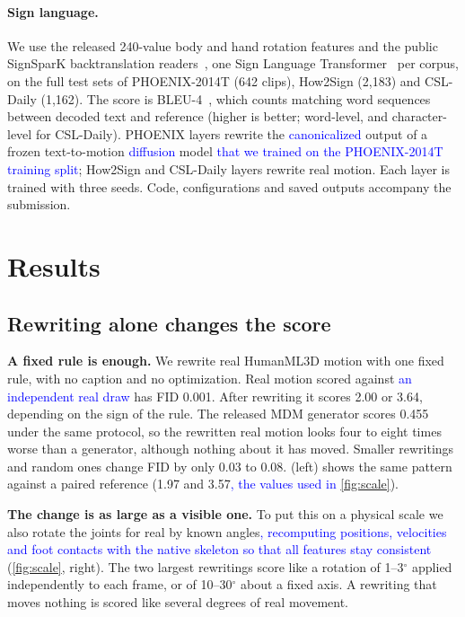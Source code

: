 \documentclass[10pt,twocolumn,letterpaper]{article}
\newcommand{\new}[1]{\textcolor{blue}{#1}}%
\begin{document}
\paragraph{Sign language.}
We use the released 240-value body and hand rotation features and the public SignSparK backtranslation readers~\cite{low2026,signsparkbt}, one Sign Language Transformer~\cite{camgoz2020} per corpus, on the full test sets of PHOENIX-2014T (642 clips), How2Sign (2,183) and CSL-Daily (1,162). The score is BLEU-4~\cite{papineni2002,post2018}, which counts matching word sequences between decoded text and reference (higher is better; word-level, and character-level for CSL-Daily). PHOENIX layers rewrite the \new{canonicalized} output of a frozen text-to-motion \new{diffusion} model \new{that we trained on the PHOENIX-2014T training split}; How2Sign and CSL-Daily layers rewrite real motion. Each layer is trained with three seeds. Code, configurations and saved outputs accompany the submission.

\section{Results}
\subsection{Rewriting alone changes the score}
\textbf{A fixed rule is enough.} We rewrite real HumanML3D motion with one fixed rule, with no caption and no optimization. Real motion scored against \new{an independent real draw} has FID 0.001. After rewriting it scores 2.00 or 3.64, depending on the sign of the rule. The released MDM generator scores 0.455 under the same protocol, so the rewritten real motion looks four to eight times worse than a generator, although nothing about it has moved. Smaller rewritings and random ones change FID by only 0.03 to 0.08.  (left) shows the same pattern against a paired reference (1.97 and 3.57\new{, the values used in \cref{fig:scale}}).

\textbf{The change is as large as a visible one.} To put this on a physical scale we also rotate the joints for real by known angles\new{, recomputing positions, velocities and foot contacts with the native skeleton so that all features stay consistent} (\cref{fig:scale}, right). The two largest rewritings score like a rotation of 1--3$^\circ$ applied independently to each frame, or of 10--30$^\circ$ about a fixed axis. A rewriting that moves nothing is scored like several degrees of real movement.
\end{document}
